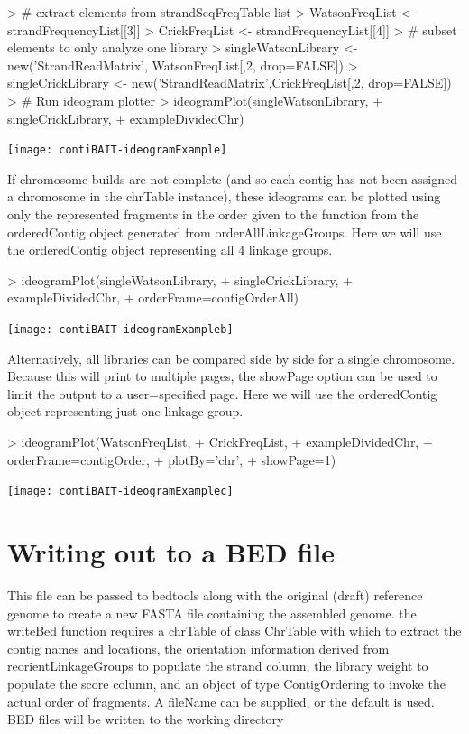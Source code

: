 \documentclass{article}
\begin{document}
\begin{Schunk}
\begin{Sinput}
> # extract elements from strandSeqFreqTable list
> WatsonFreqList <- strandFrequencyList[[3]]
> CrickFreqList <- strandFrequencyList[[4]]
> # subset elements to only analyze one library
> singleWatsonLibrary <- new('StrandReadMatrix', WatsonFreqList[,2, drop=FALSE])
> singleCrickLibrary <- new('StrandReadMatrix',CrickFreqList[,2, drop=FALSE]) 
> # Run ideogram plotter
> ideogramPlot(singleWatsonLibrary,
+ singleCrickLibrary,
+ exampleDividedChr)
\end{Sinput}
\end{Schunk}
\texttt{[image: contiBAIT-ideogramExample]}

If chromosome builds are not complete (and so each contig has not been assigned a chromosome in the chrTable instance), these ideograms can be plotted using only the represented fragments in the order given to the function from the orderedContig object generated from orderAllLinkageGroups.  Here we will use the orderedContig object representing all 4 linkage groups.

\begin{Schunk}
\begin{Sinput}
> ideogramPlot(singleWatsonLibrary,
+ singleCrickLibrary,
+ exampleDividedChr,
+ orderFrame=contigOrderAll)
\end{Sinput}
\end{Schunk}
\texttt{[image: contiBAIT-ideogramExampleb]}

Alternatively, all libraries can be compared side by side for a single chromosome. Because this will print to multiple pages, the showPage option can be used to limit the output to a user=specified page. Here we will use the orderedContig object representing just one linkage group.

\begin{Schunk}
\begin{Sinput}
> ideogramPlot(WatsonFreqList,
+ CrickFreqList,
+ exampleDividedChr,
+ orderFrame=contigOrder,
+ plotBy='chr',
+ showPage=1)
\end{Sinput}
\end{Schunk}
\texttt{[image: contiBAIT-ideogramExamplec]}


\section{Writing out to a BED file}
This file can be passed to bedtools along with the original (draft) reference genome to create a new FASTA file containing the assembled genome. the writeBed function requires a chrTable of class ChrTable with which to extract the contig names and locations, the orientation information derived from reorientLinkageGroups to populate the strand column, the library weight to populate the score column, and an object of type ContigOrdering to invoke the actual order of fragments.  A fileName can be supplied, or the default is used. BED files will be written to the working directory
\end{document}
